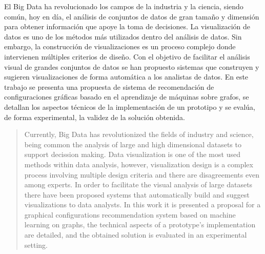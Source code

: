 \begin{resumen}
	El Big Data ha revolucionado los campos de 
	la industria y la ciencia, siendo com\'un, hoy en d\'ia, el an\'alisis de
	conjuntos de datos de gran tama\~no y dimensi\'on para obtener informaci\'on
	que apoye la toma de decisiones.
	La visualizaci\'on de datos es uno de los m\'etodos m\'as utilizados
	dentro del an\'alisis de datos. Sin embargo, la construcci\'on de visualizaciones es un proceso complejo donde intervienen
	m\'ultiples criterios de dise\~no. Con el objetivo de facilitar el an\'alisis visual de grandes conjuntos
	de datos se han propuesto sistemas que construyen y sugieren visualizaciones
	de forma autom\'atica a los analistas de datos. En este trabajo se presenta
	una propuesta de sistema de recomendaci\'on de configuraciones gr\'aficas basado
	en el aprendizaje de m\'aquinas sobre grafos, se detallan los aspectos
	t\'ecnicos de la implementaci\'on de un prototipo y se eval\'ua, de forma
	experimental, la validez de la soluci\'on obtenida.
\end{resumen}

\begin{abstract}
	Currently, Big Data has revolutionized the fields of
industry and science, being common the analysis of large and 
high dimensional datasets to support decission making.
Data visualization is one of the most used methods
within data analysis, however, visualization design is a complex process involving
multiple design criteria and there are
disagreements even among experts. In order to facilitate the visual analysis of large datasets
there have been proposed systems that automatically build and suggest visualizations
 to data analysts. In this work it is presented
a proposal for a graphical configurations recommendation system based on
machine learning on graphs, the technical aspects of a prototype's implementation
are detailed, and the obtained solution is evaluated in an experimental setting.

\end{abstract}